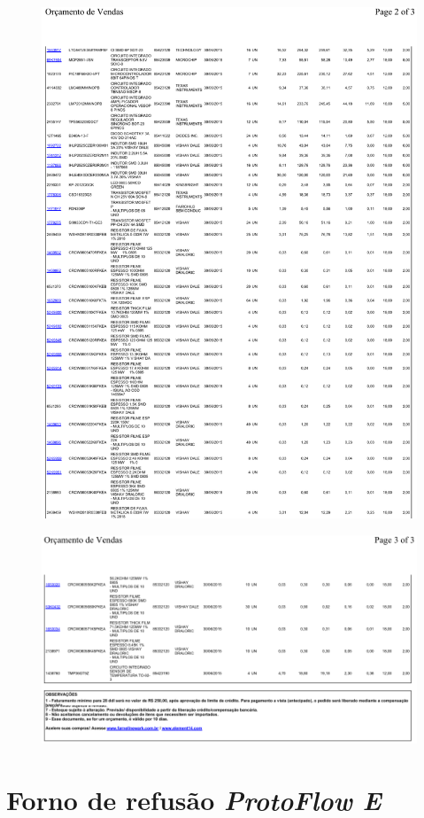 \documentclass[
	12pt,				%
	openright,			%
	oneside,			%
	a4paper,			%
	english,			%
	french,				%
	spanish,			%
	brazil,				%
	oldfontcommands
	]{abntex2}
\begin{document}
\begin{apendicesenv}
	\begin{figure}[th]
		\centering
		\includegraphics[width=0.9\linewidth]{./anexos/Pedido1898452}	
	\end{figure}
	
	\begin{figure}[th]
		\centering
		\includegraphics[width=0.9\linewidth]{./anexos/Pedido1898453}	
	\end{figure}
	
\chapter[Forno de refusão ProtoFlow E]{Forno de refusão \textit{ProtoFlow E}} \label{ProtoFlow}
	

\end{apendicesenv}
\end{document}
